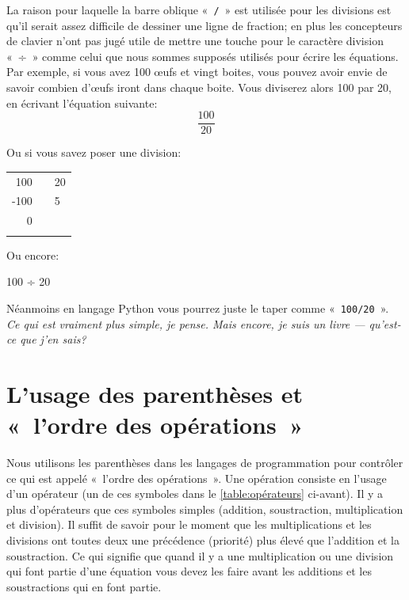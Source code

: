 La raison pour laquelle la barre oblique «~\texttt{/}~» est utilisée pour les divisions est qu'il serait assez difficile de dessiner une ligne de fraction; en plus les concepteurs de clavier n'ont pas jugé utile de mettre une touche pour le caractère division «~÷~» comme celui que nous sommes supposés utilisés pour écrire les équations. Par exemple, si vous avez 100 œufs et vingt boites, vous pouvez avoir envie de savoir combien d'œufs iront dans chaque boite. Vous diviserez alors 100 par 20, en écrivant l'équation suivante:
\begin{displaymath}
\frac{100}{20}
\end{displaymath}

Ou si vous savez poser une division:

\begin{center}
\begin{tabular}{rr|l}
100& &20\\
\cline{3-3}
-100& &5\\
\cline{1-1}
0& &\\
 & & 
\end{tabular}
\end{center}

Ou encore:
\begin{center}
100 ÷ 20
\end{center}

Néanmoins en langage Python vous pourrez juste le taper comme «~\texttt{100/20}~».\\


\emph{Ce qui est vraiment plus simple, je pense. Mais encore, je suis un livre --- qu'est-ce que j'en sais?} 

\section{L'usage des parenthèses et «~l'ordre des opérations~»}

Nous utilisons les parenthèses dans les langages de programmation pour contrôler ce qui est appelé «~l'ordre des opérations~». Une opération consiste en l'usage d'un opérateur (un de ces symboles dans le  \autoref{table:opérateurs} ci-avant). Il y a plus d'opérateurs que ces symboles simples (addition, soustraction, multiplication et division). Il suffit de savoir pour le moment que les multiplications et les divisions ont toutes deux une précédence (priorité) plus élevé que l'addition et la soustraction. Ce qui signifie que quand il y a une multiplication ou une division qui font partie d'une équation vous devez les faire avant les additions et les soustractions qui en font partie.

